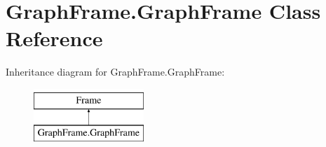 \hypertarget{classGraphFrame_1_1GraphFrame}{}\section{Graph\+Frame.\+Graph\+Frame Class Reference}
\label{classGraphFrame_1_1GraphFrame}
Inheritance diagram for Graph\+Frame.\+Graph\+Frame\+:\begin{figure}[H]
\begin{center}
\leavevmode
\includegraphics[height=2.000000cm]{classGraphFrame_1_1GraphFrame}
\end{center}
\end{figure}
